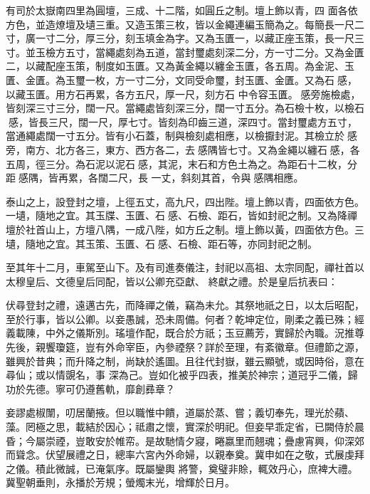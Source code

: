 \begin{pinyinscope}
 有司於太嶽南四里為圓壇，三成、十二階，如圓丘之制。壇上飾以青，四
 面各依方色，並造燎壇及壝三重。又造玉策三枚，皆以金繩連編玉簡為之。每簡長一尺二寸，廣一寸二分，厚三分，刻玉填金為字。又為玉匱一，以藏正座玉策，長一尺三寸。並玉檢方五寸，當繩處刻為五道，當封璽處刻深二分，方一寸二分。又為金匱二，以藏配座玉策，制度如玉匱。又為黃金繩以纏金玉匱，各五周。為金泥、玉匱、金匱。為玉璽一枚，方一寸二分，文同受命璽，封玉匱、金匱。又為石感，以藏玉匱。用方石再累，各方五尺，厚一尺，刻方石
 中令容玉匱。感旁施檢處，皆刻深三寸三分，闊一尺。當繩處皆刻深三分，闊一寸五分。為石檢十枚，以檢石感，皆長三尺，闊一尺，厚七寸。皆刻為印齒三道，深四寸。當封璽處方五寸，當通繩處闊一寸五分。皆有小石蓋，制與檢刻處相應，以檢擫封泥。其檢立於感旁，南方、北方各三，東方、西方各二，去感隅皆七寸。又為金繩以纏石感，各五周，徑三分。為石泥以泥石感，其泥，末石和方色土為之。為距石十二枚，分距感隅，皆再累，各闊二尺，長
 一丈，斜刻其首，令與感隅相應。



 泰山之上，設登封之壇，上徑五丈，高九尺，四出陛。壇上飾以青，四面依方色。一壝，隨地之宜。其玉牒、玉匱、石感、石檢、距石，皆如封祀之制。又為降禪壇於社首山上，方壇八隅，一成八陛，如方丘之制。壇上飾以黃，四面依方色。三壝，隨地之宜。其玉策、玉匱、石感、石檢、距石等，亦同封祀之制。



 至其年十二月，車駕至山下。及有司進奏儀注，封祀以高祖、太宗同配，禪社首以太穆皇后、文德皇后同配，皆以公卿充亞獻、
 終獻之禮。於是皇后抗表曰：



 伏尋登封之禮，遠邁古先，而降禪之儀，竊為未允。其祭地祇之日，以太后昭配，至於行事，皆以公卿。以妾愚誠，恐未周備。何者？乾坤定位，剛柔之義已殊；經義載陳，中外之儀斯別。瑤壇作配，既合於方祇；玉豆薦芳，實歸於內職。況推尊先後，親饗瓊筵，豈有外命宰臣，內參禋祭？詳於至理，有紊徽章。但禮節之源，雖興於昔典；而升降之制，尚缺於遙圖。且往代封嶽，雖云顯號，或因時俗，意在尋仙；或以情覬名，事
 深為己。豈如化被乎四表，推美於神宗；道冠乎二儀，歸功於先德。寧可仍遵舊軌，靡創彞章？



 妾謬處椒闈，叨居蘭掖。但以職惟中饋，道屬於蒸、嘗；義切奉先，理光於蘋、藻。罔極之思，載結於因心；祗肅之懷，實深於明祀。但妾早乖定省，已闕侍於晨昏；今屬崇禋，豈敢安於帷帟。是故馳情夕寢，睠嬴里而翹魂；疊慮宵興，仰深郊而聳念。伏望展禮之日，總率六宮內外命婦，以親奉奠。冀申如在之敬，式展虔拜之儀。積此微誠，已淹氣序。既屬鑾輿
 將警，奠璧非賒，輒效丹心，庶裨大禮。冀聖朝垂則，永播於芳規；螢燭末光，增輝於日月。




\end{pinyinscope}
